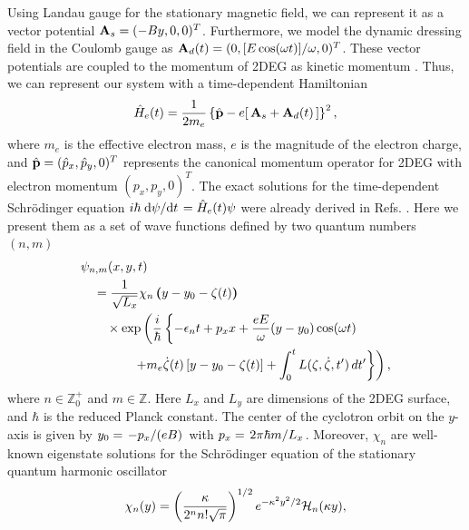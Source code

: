 \documentclass[
 reprint,
 amsmath,amssymb,
 aps,
 prb,
]{revtex4-2}
\begin{document}
Using Landau gauge for the stationary magnetic field, we can represent it as a vector potential $\vb{A}_{s} = (-By,0,0)^{T}$. Furthermore, we model the dynamic dressing field in the Coulomb gauge as $\vb{A}_{d}(t) = (0,[E\cos(\omega t)]/\omega,0)^{T}$. These vector potentials are coupled to the momentum of 2DEG as kinetic momentum \cite{mahan00,bruus04}. Thus, we can represent our system with a time-dependent Hamiltonian
\begin{equation} \label{eq:1}
  \hat{H}_e(t) =
  \frac{1}{2m_e}
  \left\{ \hat{\vb{p}} - e\right[ \vb{A}_{s}+\vb{A}_{d}(t) \left] \right\}^2,
\end{equation}
where $m_e$ is the effective electron mass, $e$ is the magnitude of the electron charge, and $\hat{\vb{p}} = (\hat{p}_x,\hat{p}_y,0)^{T}$ represents the canonical momentum operator for 2DEG with electron momentum $(p_{x},p_{y},0)^{T}$.
The exact solutions for the time-dependent Schrödinger equation $i\hbar \dv*{\psi}{t} = \hat{H}_e(t)\psi$ were already derived in Refs. \cite{husimi53,ditt98,dini16}. Here we present them as a set of wave functions defined by two quantum numbers $(n,m)$
\begin{equation} \label{eq:2}
  \begin{aligned}
    &\psi_{n,m}(x,y,t)  \\
      & \quad = \frac{1}{\sqrt{L_x}}
        \chi_n \bm{\left(} y - y_0 - \zeta(t) \bm{\right)}\\
      & \qquad \times
        \exp \bm{\left(}
        \frac{i}{\hbar}\left\{- \epsilon_n t
        + p_x x + \frac{eE}{\omega}(y - y_0)\cos(\omega t) \right.\right.\\
      & \left.\left. \qquad\qquad +
        m_e\dot{\zeta}(t)\left[y - y_0 -\zeta(t)\right] +
        \int_0^{t}L(\zeta,\dot{\zeta},t')\,dt' \right\}\bm{\right)},
  \end{aligned}
\end{equation}
where $n \in \mathbb{Z}^+_0$ and $m \in \mathbb{Z}$. Here $L_{x}$ and $L_{y}$ are dimensions of the 2DEG surface, and $\hbar$ is the reduced Planck constant. The center of the cyclotron orbit on the $y$-axis is given by $y_0 = \flatfrac{-p_x}{(eB)}$ with $p_x = \flatfrac{2\pi\hbar m}{L_x}$.
Moreover, $\chi_n$ are well-known eigenstate solutions for the Schrödinger equation of the stationary quantum harmonic oscillator
\begin{equation} \label{eq:3}
  \chi_n(y) =
  \left( \frac{\kappa}{2^{n}n! \sqrt{\pi}}\right)^{1/2}
  e^{-\kappa^2 y^2/2}
  \mathcal{H}_n \qty(\kappa y),
\end{equation}
\end{document}
